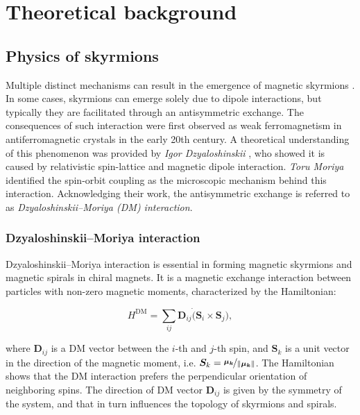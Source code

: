 \chapter{Theoretical background}
\label{chap1}

\section{Physics of skyrmions}

Multiple distinct mechanisms can result in the emergence of magnetic skyrmions \cite{fert2017magnetic}. In some cases, skyrmions can emerge solely due to dipole interactions, but typically they are facilitated through an antisymmetric exchange. The consequences of such interaction were first observed as weak ferromagnetism in antiferromagnetic crystals in the early 20th century. A theoretical understanding of this phenomenon was provided by \emph{Igor Dzyaloshinskii} \cite{dzyaloshinsky1958thermodynamic}, who showed it is caused by relativistic spin-lattice and magnetic dipole interaction. \emph{Toru Moriya} \cite{PhysRev.120.91} identified the spin-orbit coupling as the microscopic mechanism behind this interaction. Acknowledging their work, the antisymmetric exchange is referred to as \emph{Dzyaloshinskii–Moriya (DM) interaction}.

\subsection{Dzyaloshinskii–Moriya interaction}

Dzyaloshinskii–Moriya interaction is essential in forming magnetic skyrmions and magnetic spirals in chiral magnets. It is a magnetic exchange interaction between particles with non-zero magnetic moments, characterized by the Hamiltonian:

\begin{equation}
	\label{DM-interaction-hamiltonian}
	H^{\text{DM}} = \sum_{ij} \bm{D}_{ij} \dot (\bm{S}_i \times \bm{S}_j),
\end{equation}

where $\bm{D}_{ij}$ is a DM vector between the $i$-th and $j$-th spin, and $\bm{S}_k$ is a unit vector in the direction of the magnetic moment, i.e. $\bm{S}_k = \nicefrac{\bm{\mu_k}}{\lVert \bm{\mu_k} \rVert}$. The Hamiltonian shows that the DM interaction prefers the perpendicular orientation of neighboring spins. The direction of DM vector $\bm{D}_{ij}$ is given by the symmetry of the system, and that in turn influences the topology of skyrmions and spirals. 

